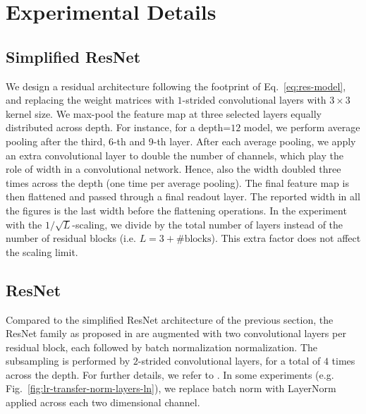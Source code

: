\documentclass{article} %
\begin{document}
\section{Experimental Details}
\label{app:exp-details}

\subsection{Simplified ResNet}
\label{sec:s-resnet}
We design a residual architecture following the footprint of Eq.~\ref{eq:res-model}, and replacing the weight matrices with $1$-strided convolutional layers with $3 \times 3$ kernel size. We max-pool the feature map at three selected layers equally distributed across depth. For instance, for a depth=$12$ model, we perform average pooling after the third, 6-th and 9-th layer. After each average pooling, we apply an extra convolutional layer to double the number of channels, which play the role of width in a convolutional network. Hence, also the width doubled three times across the depth (one time per average pooling). The final feature map is then flattened and passed through a final readout layer. The reported width in all the figures is the last width before the flattening operations. In the experiment with the $1/\sqrt{L}$-scaling, we divide by the total number of layers instead of the number of residual blocks (i.e. $L = 3 + \text{\# blocks}$). This extra factor does not affect the scaling limit.   

\subsection{ResNet}
\label{sec:resnet}

Compared to the simplified ResNet architecture of the previous section, the ResNet family as proposed in \cite{he2016deep} are augmented with two convolutional layers per residual block, each followed by batch normalization normalization. The subsampling is performed by $2$-strided convolutional layers, for a total of $4$ times across the depth. For further details, we refer to \cite{he2016deep}. In some experiments (e.g. Fig.~\ref{fig:lr-transfer-norm-layers-ln}), we replace batch norm with LayerNorm applied across each two dimensional channel. 
\end{document}
